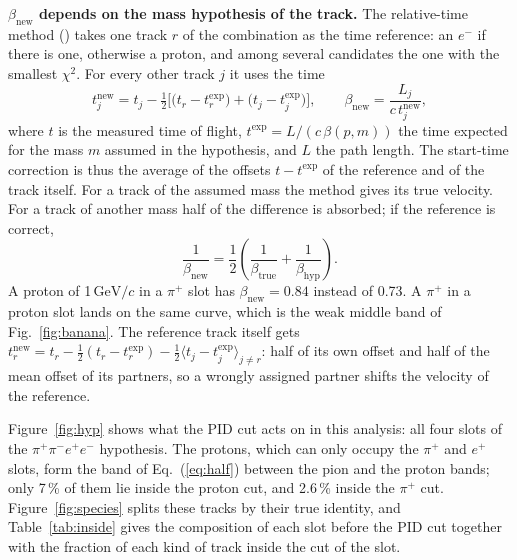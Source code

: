 \documentclass[11pt,a4paper]{article}
\newcommand{\pip}{\ensuremath{\pi^{+}}\xspace}
\newcommand{\ppee}{\ensuremath{\pi^{+}\pi^{-}e^{+}e^{-}}\xspace}
\newcommand{\betanew}{\ensuremath{\beta_{\mathrm{new}}}\xspace}
\newcommand{\GeVc}{\ensuremath{\mathrm{GeV}/c}\xspace}
\newcommand{\code}[1]{\texttt{\detokenize{#1}}}
\begin{document}
\textbf{$\betanew$ depends on the mass hypothesis of the track.} The relative-time method
(\code{HTimeCut}) takes one track $r$ of the combination as the time reference: an $e^-$ if
there is one, otherwise a proton, and among several candidates the one with the smallest
$\chi^2$. For every other track $j$ it uses the time
\begin{equation}
t_j^{\mathrm{new}} = t_j - \tfrac12\Big[\big(t_r - t_r^{\mathrm{exp}}\big) + \big(t_j - t_j^{\mathrm{exp}}\big)\Big],
\qquad \betanew = \frac{L_j}{c\,t_j^{\mathrm{new}}},
\label{eq:tnew}
\end{equation}
where $t$ is the measured time of flight, $t^{\mathrm{exp}} = L/(c\,\beta(p,m))$ the time
expected for the mass $m$ assumed in the hypothesis, and $L$ the path length. The start-time
correction is thus the average of the offsets $t - t^{\mathrm{exp}}$ of the reference and of
the track itself. For a track of the assumed mass the method gives its true velocity. For a
track of another mass half of the difference is absorbed; if the reference is correct,
\begin{equation}
\frac{1}{\betanew} = \frac12\left(\frac{1}{\beta_{\mathrm{true}}} + \frac{1}{\beta_{\mathrm{hyp}}}\right).
\label{eq:half}
\end{equation}
A proton of 1\,\GeVc in a \pip slot has $\betanew = 0.84$ instead of 0.73. A \pip in a proton
slot lands on the same curve, which is the weak middle band of Fig.~\ref{fig:banana}. The
reference track itself gets
$t_r^{\mathrm{new}} = t_r - \tfrac12(t_r - t_r^{\mathrm{exp}}) - \tfrac12\langle t_j - t_j^{\mathrm{exp}}\rangle_{j\neq r}$:
half of its own offset and half of the mean offset of its partners, so a wrongly assigned
partner shifts the velocity of the reference.

Figure~\ref{fig:hyp} shows what the PID cut acts on in this analysis: all four slots of the
\ppee hypothesis. The protons, which can only occupy the \pip and $e^+$ slots, form the band
of Eq.~(\ref{eq:half}) between the pion and the proton bands; only 7\,\% of them lie inside
the proton cut, and 2.6\,\% inside the \pip cut. Figure~\ref{fig:species} splits these tracks by
their true identity, and Table~\ref{tab:inside} gives the composition of each slot before the
PID cut together with the fraction of each kind of track inside the cut of the slot.
\end{document}
